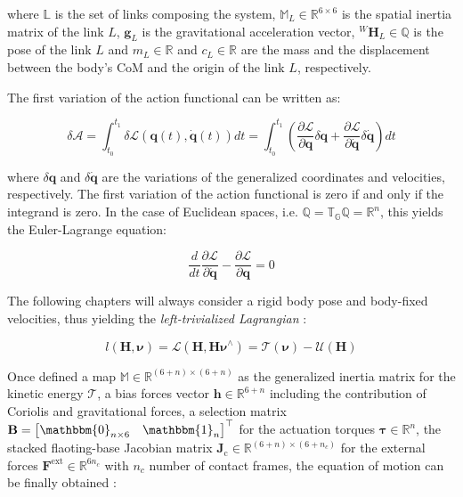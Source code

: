 where $\mathbb{L}$ is the set of links composing the system, $\mathbb{M} _L \in \mathbb{R} ^{6 \times 6}$ is the spatial inertia matrix of the link $L$, $\mathbf{g} _L$ is the gravitational acceleration vector, ${}^W\mathbf{H} _L \in \mathbb{Q}$ is the pose of the link $L$ and $m _L \in \mathbb{R}$ and $c _L \in \mathbb{R}$ are the mass and the displacement between the body's \ac{CoM} and the origin of the link $L$, respectively.

The first variation of the action functional can be written as:

\begin{equation}
    \delta \mathcal{A} = \int _{t _0} ^{t _1} \delta \mathcal{L} (\mathbf{q}(t), \mathbf{\dot{q}}(t))dt = \int _{t _0} ^{t _1} \left( \frac{\partial \mathcal{L}}{\partial \mathbf{q}} \delta \mathbf{q} + \frac{\partial \mathcal{L}}{\partial \mathbf{\dot{q}}} \delta \mathbf{\dot{q}} \right) dt
\end{equation}

where $\delta \mathbf{q}$ and $\delta \mathbf{\dot{q}}$ are the variations of the generalized coordinates and velocities, respectively. The first variation of the action functional is zero if and only if the integrand is zero. In the case of Euclidean spaces, i.e. $\mathbb{Q} = \mathbb{T} _{\mathbb{G}}\mathbb{Q} =\mathbb{R} ^n$, this yields the Euler-Lagrange equation:

\begin{equation}
    \frac{d}{dt} \frac{\partial \mathcal{L}}{\partial \mathbf{\dot{q}}} - \frac{\partial \mathcal{L}}{\partial \mathbf{q}} = 0
    \label{eqn:lagrangian}
\end{equation}

The following chapters will always consider a rigid body pose and body-fixed velocities, thus yielding the \textit{left-trivialized Lagrangian} \citep{traversaro_modelling_2019}:

\begin{equation}
    l(\mathbf{H}, \boldsymbol{\nu}) = \mathcal{L}(\mathbf{H}, \mathbf{H}\boldsymbol{\nu}^\wedge) = \mathcal{T}(\boldsymbol{\nu}) - \mathcal{U}(\mathbf{H})
\end{equation}

Once defined a map $\mathbb{M} \in \mathbb{R}^{(6+n) \times (6+n)}$ as the generalized inertia matrix for the kinetic energy $\mathcal{T}$, a bias forces vector $\mathbf{h} \in \mathbb{R} ^{6+n}$ including the contribution of Coriolis and gravitational forces, a selection matrix $\mathbf{B} = \begin{bmatrix} \mathbbm{0}_{n\times6} & \mathbbm{1}_n \end{bmatrix}^\top$ for the actuation torques $\boldsymbol{\tau} \in \mathbb{R} ^n$, the stacked flaoting-base Jacobian matrix $\mathbf{J} _\text{c} \in \mathbb{R} ^{(6+n) \times (6+n_c)}$ for the external forces $\mathbf{F} ^\text{ext} \in \mathbb{R} ^{6n_c}$ with $n_c$ number of contact frames, the equation of motion can be finally obtained \citep{siciliano_handbook_2008}:

